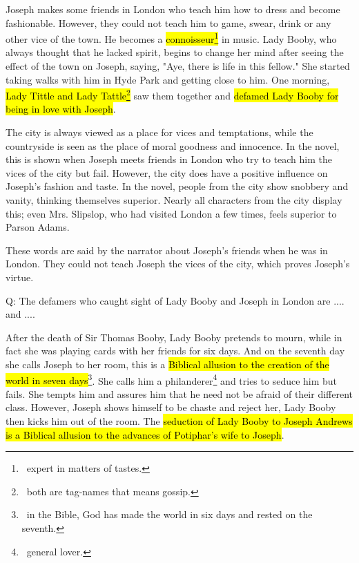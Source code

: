 \documentclass[12pt, a4paper]{article}
\begin{document}
\enlargethispage{3\baselineskip}


\ind Joseph makes some friends in London who teach him how to dress and become 
fashionable. However, they could not teach him to game, swear, drink or
any other vice of the town. He becomes a \hl{connoisseur\footnote{\, 
expert in matters of tastes.}} in music. Lady Booby, who always thought that 
he lacked spirit, begins to change her mind after seeing the effect of the town
on Joseph, saying, "Aye, there is life in this fellow." She started taking walks
with him in Hyde Park and getting close to him. One morning, \hl{Lady Tittle and Lady
Tattle\footnote{\, both are tag-names that means gossip.}} saw them together and
\hl{defamed Lady Booby for being in love  with Joseph}.


\ind The city is always viewed as a place for vices and temptations, while the countryside
is seen as the place of moral goodness and innocence. In the novel, this is shown when Joseph meets friends in London
who try to teach him the vices of the city but fail. However, the city does have a positive influence on
Joseph's fashion and taste. In the novel, people from the city show snobbery and vanity,
thinking themselves superior. Nearly all characters from the city display this; even 
Mrs. Slipslop, who had visited London a few times, feels superior to Parson Adams.




These words are said by the narrator about Joseph's friends when he was in London.
They could not teach Joseph the vices of the city, which proves Joseph's virtue.


{Q: The defamers who caught sight of Lady
Booby and Joseph in London are .... and .... }



\ind After the death of Sir Thomas Booby, Lady Booby pretends to mourn, while in fact she was
playing cards with her friends for six days. And on the seventh day she calls Joseph to her room,
this is a \hl{Biblical allusion to the creation of the world in seven days}\footnote{\, in the Bible, God has
made the world in six days and rested on the seventh.}. She calls him
a philanderer\footnote{\, general lover.} and tries to seduce him but fails. She tempts
him and assures him that he need not be afraid of their different class. However, Joseph shows himself 
to be chaste and reject her, Lady Booby then kicks him out of the room.
The \hl{seduction of Lady Booby to Joseph Andrews is a Biblical allusion to the advances
of Potiphar's wife to Joseph}.
\end{document}
